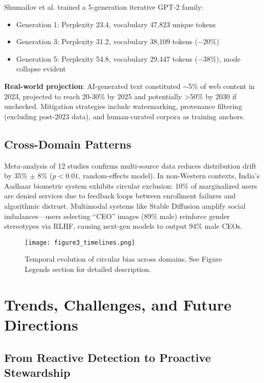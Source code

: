 \documentclass[11pt]{article}
\begin{document}
Shumailov et al.\cite{shumailov2024} trained a 5-generation iterative GPT-2 family:
\begin{itemize}
    \item Generation 1: Perplexity 23.4, vocabulary 47,823 unique tokens
    \item Generation 3: Perplexity 31.2, vocabulary 38,109 tokens ($-20\%$)
    \item Generation 5: Perplexity 54.8, vocabulary 29,447 tokens ($-38\%$), mode collapse evident
\end{itemize}

\textbf{Real-world projection}: AI-generated text constituted $\sim$5\% of web content in 2023, projected to reach 20-30\% by 2025 and potentially >50\% by 2030 if unchecked. Mitigation strategies include watermarking, provenance filtering (excluding post-2023 data), and human-curated corpora as training anchors.

\subsection{Cross-Domain Patterns}

Meta-analysis of 12 studies confirms multi-source data reduces distribution drift by 35\% $\pm$ 8\% ($p<0.01$, random-effects model). In non-Western contexts, India's Aadhaar biometric system exhibits circular exclusion: 10\% of marginalized users are denied services due to feedback loops between enrollment failures and algorithmic distrust. Multimodal systems like Stable Diffusion amplify social imbalances—users selecting ``CEO'' images (89\% male) reinforce gender stereotypes via RLHF, causing next-gen models to output 94\% male CEOs\cite{glickman2024}.

\begin{figure}[H]
\centering
\texttt{[image: figure3\_timelines.png]}
\caption{Temporal evolution of circular bias across domains. See Figure Legends section for detailed description.}
\label{fig:timelines}
\end{figure}

\section{Trends, Challenges, and Future Directions}

\subsection{From Reactive Detection to Proactive Stewardship}
\end{document}
